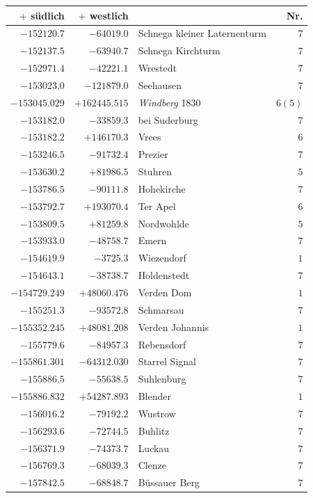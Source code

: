 \begin{center}\begingroup\fontsize{8}{9}\selectfont
\setlength{\tabcolsep}{4pt}
\begin{tabular}{r|r|p{170pt}|r}\hline
\(+\) südlich&\(+\) westlich&&Nr.\\\hline
\(-152120.7\)&\(-64019.0\)&Schnega kleiner Laternenturm&\(7\)\\
\(-152137.5\)&\(-63940.7\)&Schnega Kirchturm&\(7\)\\
\(-152971.4\)&\(-42221.1\)&Wrestedt&\(7\)\\
\(-153023.0\)&\(-121879.0\)&Seehausen&\(7\)\\
\(-153045.029\)&\(+162445.515\)&\textit{Windberg} 1830&\(6 (5)\)\\
\(-153182.0\)&\(-33859.3\)&bei Suderburg&\(7\)\\
\(-153182.2\)&\(+146170.3\)&Vrees&\(6\)\\
\(-153246.5\)&\(-91732.4\)&Prezier&\(7\)\\
\(-153630.2\)&\(+81986.5\)&Stuhren&\(5\)\\
\(-153786.5\)&\(-90111.8\)&Hohekirche&\(7\)\\
\(-153792.7\)&\(+193070.4\)&Ter Apel&\(6\)\\
\(-153809.5\)&\(+81259.8\)&Nordwohlde&\(5\)\\
\(-153933.0\)&\(-48758.7\)&Emern&\(7\)\\
\(-154619.9\)&\(-3725.3\)&Wiezendorf&\(1\)\\
\(-154643.1\)&\(-38738.7\)&Holdenstedt&\(7\)\\
\(-154729.249\)&\(+48060.476\)&Verden Dom&\(1\)\\
\(-155251.3\)&\(-93572.8\)&Schmarsau&\(7\)\\
\(-155352.245\)&\(+48081.208\)&Verden Johannis&\(1\)\\
\(-155779.6\)&\(-84957.3\)&Rebensdorf&\(7\)\\
\(-155861.301\)&\(-64312.030\)&Starrel Signal&\(7\)\\
\(-155886.5\)&\(-55638.5\)&Suhlenburg&\(7\)\\
\(-155886.832\)&\(+54287.893\)&Blender&\(1\)\\
\(-156016.2\)&\(-79192.2\)&Wustrow&\(7\)\\
\(-156293.6\)&\(-72744.5\)&Buhlitz&\(7\)\\
\(-156371.9\)&\(-74373.7\)&Luckau&\(7\)\\
\(-156769.3\)&\(-68039.3\)&Clenze&\(7\)\\
\(-157842.5\)&\(-68848.7\)&Büssauer Berg&\(7\)\\

\end{tabular}
\end{center}
